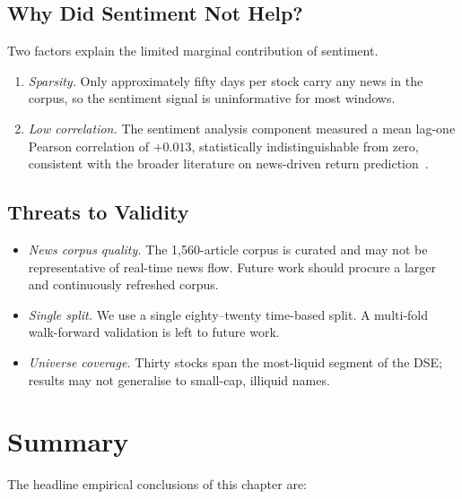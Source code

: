 \documentclass[12pt,a4paper,oneside]{report}
\begin{document}
\subsection{Why Did Sentiment Not Help?}

Two factors explain the limited marginal contribution of sentiment.

\begin{enumerate}[leftmargin=*,itemsep=2pt]
  \item \emph{Sparsity.} Only approximately fifty days per stock
        carry any news in the corpus, so the sentiment signal is
        uninformative for most windows.
  \item \emph{Low correlation.} The sentiment analysis component
        measured a mean lag-one Pearson correlation of $+0.013$,
        statistically indistinguishable from zero, consistent with
        the broader literature on news-driven return
        prediction~\cite{lopez2023canchatgpt,sezer2020financial}.
\end{enumerate}

\subsection{Threats to Validity}

\begin{itemize}[leftmargin=*,itemsep=2pt]
  \item \emph{News corpus quality.} The 1{,}560-article corpus is
        curated and may not be representative of real-time news
        flow. Future work should procure a larger and continuously
        refreshed corpus.
  \item \emph{Single split.} We use a single eighty--twenty
        time-based split. A multi-fold walk-forward validation is
        left to future work.
  \item \emph{Universe coverage.} Thirty stocks span the
        most-liquid segment of the DSE; results may not
        generalise to small-cap, illiquid names.
\end{itemize}

\section{Summary}

The headline empirical conclusions of this chapter are:
\end{document}
